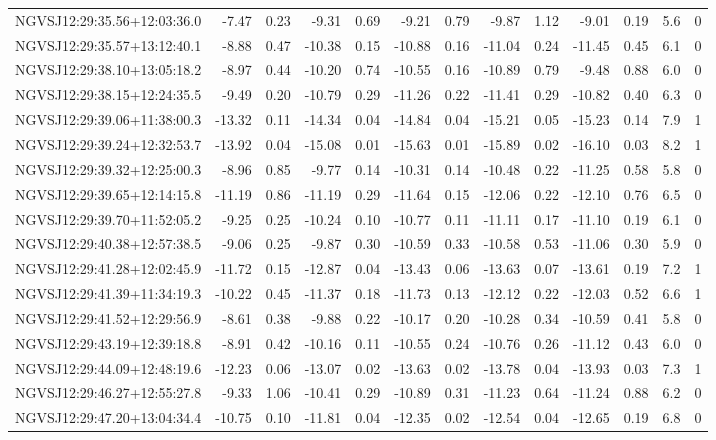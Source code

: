 \begin{tabular}{lrrrrrrrrrrcc}
NGVSJ12:29:35.56+12:03:36.0 & -7.47 & 0.23 & -9.31 & 0.69 & -9.21 & 0.79 & -9.87 & 1.12 & -9.01 & 0.19 & 5.6 & 0 \\
NGVSJ12:29:35.57+13:12:40.1 & -8.88 & 0.47 & -10.38 & 0.15 & -10.88 & 0.16 & -11.04 & 0.24 & -11.45 & 0.45 & 6.1 & 0 \\
NGVSJ12:29:38.10+13:05:18.2 & -8.97 & 0.44 & -10.20 & 0.74 & -10.55 & 0.16 & -10.89 & 0.79 & -9.48 & 0.88 & 6.0 & 0 \\
NGVSJ12:29:38.15+12:24:35.5 & -9.49 & 0.20 & -10.79 & 0.29 & -11.26 & 0.22 & -11.41 & 0.29 & -10.82 & 0.40 & 6.3 & 0 \\
NGVSJ12:29:39.06+11:38:00.3 & -13.32 & 0.11 & -14.34 & 0.04 & -14.84 & 0.04 & -15.21 & 0.05 & -15.23 & 0.14 & 7.9 & 1 \\
NGVSJ12:29:39.24+12:32:53.7 & -13.92 & 0.04 & -15.08 & 0.01 & -15.63 & 0.01 & -15.89 & 0.02 & -16.10 & 0.03 & 8.2 & 1 \\
NGVSJ12:29:39.32+12:25:00.3 & -8.96 & 0.85 & -9.77 & 0.14 & -10.31 & 0.14 & -10.48 & 0.22 & -11.25 & 0.58 & 5.8 & 0 \\
NGVSJ12:29:39.65+12:14:15.8 & -11.19 & 0.86 & -11.19 & 0.29 & -11.64 & 0.15 & -12.06 & 0.22 & -12.10 & 0.76 & 6.5 & 0 \\
NGVSJ12:29:39.70+11:52:05.2 & -9.25 & 0.25 & -10.24 & 0.10 & -10.77 & 0.11 & -11.11 & 0.17 & -11.10 & 0.19 & 6.1 & 0 \\
NGVSJ12:29:40.38+12:57:38.5 & -9.06 & 0.25 & -9.87 & 0.30 & -10.59 & 0.33 & -10.58 & 0.53 & -11.06 & 0.30 & 5.9 & 0 \\
NGVSJ12:29:41.28+12:02:45.9 & -11.72 & 0.15 & -12.87 & 0.04 & -13.43 & 0.06 & -13.63 & 0.07 & -13.61 & 0.19 & 7.2 & 1 \\
NGVSJ12:29:41.39+11:34:19.3 & -10.22 & 0.45 & -11.37 & 0.18 & -11.73 & 0.13 & -12.12 & 0.22 & -12.03 & 0.52 & 6.6 & 1 \\
NGVSJ12:29:41.52+12:29:56.9 & -8.61 & 0.38 & -9.88 & 0.22 & -10.17 & 0.20 & -10.28 & 0.34 & -10.59 & 0.41 & 5.8 & 0 \\
NGVSJ12:29:43.19+12:39:18.8 & -8.91 & 0.42 & -10.16 & 0.11 & -10.55 & 0.24 & -10.76 & 0.26 & -11.12 & 0.43 & 6.0 & 0 \\
NGVSJ12:29:44.09+12:48:19.6 & -12.23 & 0.06 & -13.07 & 0.02 & -13.63 & 0.02 & -13.78 & 0.04 & -13.93 & 0.03 & 7.3 & 1 \\
NGVSJ12:29:46.27+12:55:27.8 & -9.33 & 1.06 & -10.41 & 0.29 & -10.89 & 0.31 & -11.23 & 0.64 & -11.24 & 0.88 & 6.2 & 0 \\
NGVSJ12:29:47.20+13:04:34.4 & -10.75 & 0.10 & -11.81 & 0.04 & -12.35 & 0.02 & -12.54 & 0.04 & -12.65 & 0.19 & 6.8 & 0 \\

\end{tabular}
